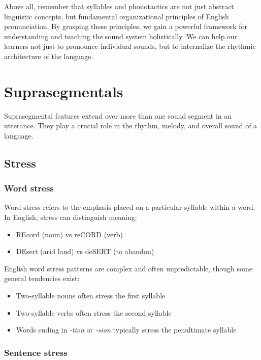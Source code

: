 Above all, remember that syllables and phonotactics are not just abstract linguistic concepts, but fundamental organizational principles of English pronunciation. By grasping these principles, we gain a powerful framework for understanding and teaching the sound system holistically. We can help our learners not just to pronounce individual sounds, but to internalize the rhythmic architecture of the language.

\section{Suprasegmentals}

Suprasegmental features extend over more than one sound segment in an utterance. They play a crucial role in the rhythm, melody, and overall sound of a language.

\subsection{Stress}\label{sec:stress}

\subsubsection{Word stress}

Word stress refers to the emphasis placed on a particular syllable within a word. In English, stress can distinguish meaning:

\begin{itemize}[noitemsep]
    \item REcord (noun) vs reCORD (verb)
    \item DEsert (arid land) vs deSERT (to abandon)
\end{itemize}

English word stress patterns are complex and often unpredictable, though some general tendencies exist:

\begin{itemize}[noitemsep]
    \item Two-syllable nouns often stress the first syllable
    \item Two-syllable verbs often stress the second syllable
    \item Words ending in \textit{-tion} or \textit{-sion} typically stress the penultimate syllable
\end{itemize}

\subsubsection{Sentence stress}


